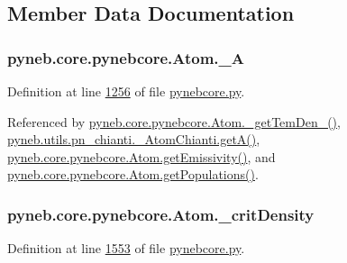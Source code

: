 \subsection{Member Data Documentation}
\hypertarget{classpyneb_1_1core_1_1pynebcore_1_1_atom_aa6416fe661b8deaa008179314727e025}{}
\subsubsection[{\+\_\+\+A}]{\setlength{\rightskip}{0pt plus 5cm}pyneb.\+core.\+pynebcore.\+Atom.\+\_\+\+A\hspace{0.3cm}{\ttfamily [private]}}\label{classpyneb_1_1core_1_1pynebcore_1_1_atom_aa6416fe661b8deaa008179314727e025}


Definition at line \hyperlink{pynebcore_8py_source_l01256}{1256} of file \hyperlink{pynebcore_8py_source}{pynebcore.\+py}.



Referenced by \hyperlink{pynebcore_8py_source_l01803}{pyneb.\+core.\+pynebcore.\+Atom.\+\_\+get\+Tem\+Den\+\_()}, \hyperlink{pn__chianti_8py_source_l00296}{pyneb.\+utils.\+pn\+\_\+chianti.\+\_\+\+Atom\+Chianti.\+get\+A()}, \hyperlink{pynebcore_8py_source_l01716}{pyneb.\+core.\+pynebcore.\+Atom.\+get\+Emissivity()}, and \hyperlink{pynebcore_8py_source_l01496}{pyneb.\+core.\+pynebcore.\+Atom.\+get\+Populations()}.

\hypertarget{classpyneb_1_1core_1_1pynebcore_1_1_atom_a1d0823a36ca030fd149522fe72908631}{}
\subsubsection[{\+\_\+crit\+Density}]{\setlength{\rightskip}{0pt plus 5cm}pyneb.\+core.\+pynebcore.\+Atom.\+\_\+crit\+Density\hspace{0.3cm}{\ttfamily [private]}}\label{classpyneb_1_1core_1_1pynebcore_1_1_atom_a1d0823a36ca030fd149522fe72908631}


Definition at line \hyperlink{pynebcore_8py_source_l01553}{1553} of file \hyperlink{pynebcore_8py_source}{pynebcore.\+py}.



